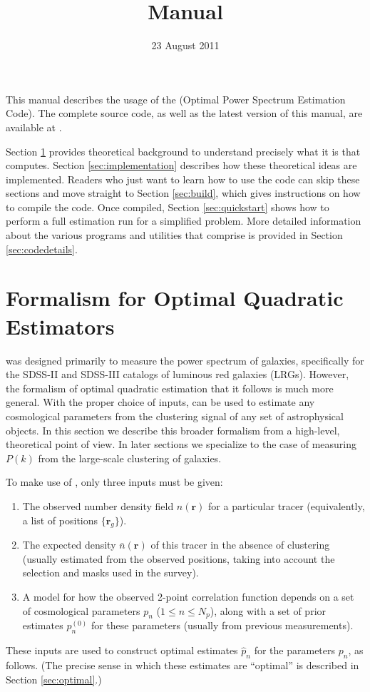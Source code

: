 \documentclass{article}
\title{\opsec \version Manual}
\date{23 August 2011}
\newcommand{\opsec}{\protect{\textrm{OPSEC}}\xspace}
\newcommand{\homepage}{\protect{\texttt{HOMEPAGE}}\xspace}
\renewcommand{\vec}[1]{\bm{#1}}
\renewcommand{\r}{\vec{r}}
\begin{document}
\maketitle

This manual describes the usage of the \opsec (Optimal Power Spectrum
Estimation Code).  The complete source code, as well as the latest version of
this manual, are available at \homepage.

Section \ref{sec:formalism} provides theoretical background to understand
precisely what it is that \opsec computes.  Section \ref{sec:implementation}
describes how these theoretical ideas are implemented.  Readers who just want
to learn how to use the code can skip these sections and move straight to
Section \ref{sec:build}, which gives instructions on how to compile the \opsec
code.  Once compiled, Section \ref{sec:quickstart} shows how to perform a full
estimation run for a simplified problem.  More detailed information about the
various programs and utilities that comprise \opsec is provided in Section
\ref{sec:codedetails}.

\tableofcontents

\section{Formalism for Optimal Quadratic Estimators}
\label{sec:formalism}

\opsec was designed primarily to measure the power spectrum of galaxies,
specifically for the SDSS-II and SDSS-III catalogs of luminous red galaxies
(LRGs).  However, the formalism of optimal quadratic estimation that it follows
is much more general.  With the proper choice of inputs, \opsec can be used to
estimate any cosmological parameters from the clustering signal of any set of
astrophysical objects.  In this section we describe this broader formalism from
a high-level, theoretical point of view.  In later sections we specialize to
the case of measuring $P(k)$ from the large-scale clustering of galaxies.

To make use of \opsec, only three inputs must be given:
\begin{enumerate}
\item The observed number density field $n(\r)$ for a particular tracer
    (equivalently, a list of positions $\{\r_g\}$).
\item The expected density $\bar{n}(\r)$ of this tracer in the absence of
    clustering (usually estimated from the observed positions, taking into
    account the selection and masks used in the survey).
\item A model for how the observed 2-point correlation function depends on a
    set of cosmological parameters $p_n$ ($1 \le n \le N_p$), along with a set
    of prior estimates $p_n^{(0)}$ for these parameters (usually from previous
    measurements).
\end{enumerate}
These inputs are used to construct optimal estimates $\hat{p}_n$ for the
parameters $p_n$, as follows.  (The precise sense in which these estimates are
``optimal'' is described in Section \ref{sec:optimal}.)
\end{document}
